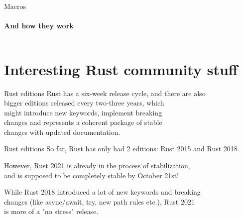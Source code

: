 \documentclass[usenames,dvipsnames,10pt,aspectratio=169]{beamer}
\begin{document}
\begin{frame}{Macros}
	\framesubtitle{And how they work}
	\inputminted[fontsize=\large]{rust}{code/macros3.rs}
\end{frame}


\section{Interesting Rust community stuff}

\begin{frame}{Rust editions}
	\Large
	Rust has a six-week release cycle, and there are also\\
	bigger editions released every two-three years, which\\
	might introduce new keywords, implement breaking\\
	changes	and represents a coherent package of stable\\
	changes with updated documentation.\\

\end{frame}

\begin{frame}{Rust editions}
	\large
	So far, Rust has only had 2 editions: Rust 2015 and Rust 2018.\\

	\vspace{0.3cm}
	
	However, Rust 2021 is already in the process of stabilization,\\
	and is supposed to be completely stable by October 21st!\\

	\vspace{0.3cm}
	
	While Rust 2018 introduced a lot of new keywords and breaking\\
	changes (like \textcolor{ucuyellow}{async}/\textcolor{ucuyellow}{await}, \textcolor{ucuyellow}{try}, 
	new path rules etc.), Rust 2021\\
	is more of a "no stress" release.
\end{frame}
\end{document}
